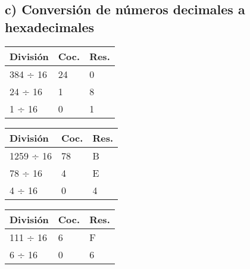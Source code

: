 \documentclass[12pt]{article}
\begin{document}
\subsection*{c) Conversión de números decimales a hexadecimales}


\begin{table}[H]
\centering
\begin{minipage}[t]{0.32\textwidth}
\centering
\begin{tabular}{lll}
\toprule
\textbf{División} & \textbf{Coc.} & \textbf{Res.} \\
\midrule
384 ÷ 16 & 24 & 0 \\
24 ÷ 16 & 1 & 8 \\
1 ÷ 16 & 0 & 1 \\
\bottomrule
\end{tabular}
\end{minipage}
\hfill
\begin{minipage}[t]{0.32\textwidth}
\centering
\begin{tabular}{lll}
\toprule
\textbf{División} & \textbf{Coc.} & \textbf{Res.} \\
\midrule
1259 ÷ 16 & 78 & B \\
78 ÷ 16 & 4 & E \\
4 ÷ 16 & 0 & 4 \\
\bottomrule
\end{tabular}
\end{minipage}
\hfill
\begin{minipage}[t]{0.32\textwidth}
\centering
\begin{tabular}{lll}
\toprule
\textbf{División} & \textbf{Coc.} & \textbf{Res.} \\
\midrule
111 ÷ 16 & 6 & F \\
6 ÷ 16 & 0 & 6 \\
\bottomrule
\end{tabular}
\end{minipage}
\end{table}
\end{document}
